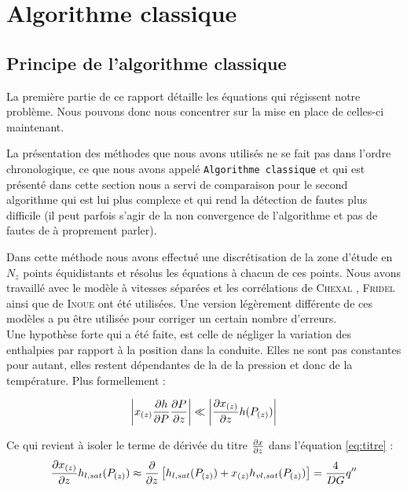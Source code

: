 \section{Algorithme classique\label{section:algo_clas}}

\subsection{Principe de l'algorithme classique}

La première partie de ce rapport détaille les équations qui régissent notre problème. Nous pouvons donc nous concentrer sur la mise en place de celles-ci maintenant.\\ \par 
La présentation des méthodes que nous avons utilisés ne se fait pas dans l'ordre chronologique, ce que nous avons appelé \texttt{Algorithme classique} et qui est présenté dans cette section nous a servi de comparaison pour le second algorithme qui est lui plus complexe et qui rend la détection de fautes plus difficile (il peut parfois s'agir de la non convergence de l'algorithme et pas de fautes de à proprement parler).\\ \par
Dans cette méthode nous avons effectué une discrétisation de la zone d'étude en $N_z$ points équidistants et résolus les équations à chacun de ces points. Nous avons travaillé avec le modèle à vitesses séparées et les corrélations de \textsc{Chexal} \cite{chexalFullrangeDriftfluxCorrelation1986}, \textsc{Fridel} \cite{freidelImprovedFrictionPressure1979a} ainsi que de \textsc{Inoue} \cite{inoueInbundleVoidMeasurement1993} ont été utilisées. Une version légèrement différente de ces modèles \cite{revellinAdiabaticTwophaseFrictional2007} a pu être utilisée pour corriger un certain nombre d'erreurs. \\

Une hypothèse forte qui a été faite, est celle de négliger la variation des enthalpies par rapport à la position dans la conduite. Elles ne sont pas constantes pour autant, elles restent dépendantes de la de la pression et donc de la température. Plus formellement :

\begin{equation}
    \left| x_{(z)}\pder[h]{P}\pder[P]{z} \right| \ll \left|\pder[x_{(z)}]{z}h(P_{(z)}) \right|
\end{equation}

Ce qui revient à isoler le terme de dérivée du titre $\pder[x]{z}$ dans l'équation \ref{eq:titre} :
\begin{equation}
     \pder[x_{(z)}]{z}h_{l,sat}(P_{(z)}) \approx \pder{z} \left[ h_{l,sat}(P_{(z)})+x_{(z)}h_{vl,sat}(P_{(z)})\right]  = \frac{4}{DG}q''
\label{eq:titreapprox}
\end{equation}

